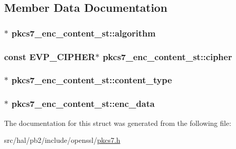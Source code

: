 \subsection{Member Data Documentation}
\subsubsection[{\texorpdfstring{algorithm}{algorithm}}]{$\ast$ pkcs7\+\_\+enc\+\_\+content\+\_\+st\+::algorithm}\hypertarget{structpkcs7__enc__content__st_af6c78a84b4ca86334dfc04a072ce1117}{}\label{structpkcs7__enc__content__st_af6c78a84b4ca86334dfc04a072ce1117}
\subsubsection[{\texorpdfstring{cipher}{cipher}}]{\setlength{\rightskip}{0pt plus 5cm}const {\bf E\+V\+P\+\_\+\+C\+I\+P\+H\+ER}$\ast$ pkcs7\+\_\+enc\+\_\+content\+\_\+st\+::cipher}\hypertarget{structpkcs7__enc__content__st_abb4444669fdf67803367ebddf34b8aff}{}\label{structpkcs7__enc__content__st_abb4444669fdf67803367ebddf34b8aff}
\subsubsection[{\texorpdfstring{content\+\_\+type}{content_type}}]{$\ast$ pkcs7\+\_\+enc\+\_\+content\+\_\+st\+::content\+\_\+type}\hypertarget{structpkcs7__enc__content__st_aae31932dd3ab5e4b1e54e9915f9c547c}{}\label{structpkcs7__enc__content__st_aae31932dd3ab5e4b1e54e9915f9c547c}
\subsubsection[{\texorpdfstring{enc\+\_\+data}{enc_data}}]{$\ast$ pkcs7\+\_\+enc\+\_\+content\+\_\+st\+::enc\+\_\+data}\hypertarget{structpkcs7__enc__content__st_ab4d08c0f1b94885ea0d0380ef4745c7b}{}\label{structpkcs7__enc__content__st_ab4d08c0f1b94885ea0d0380ef4745c7b}


The documentation for this struct was generated from the following file\+:\begin{DoxyCompactItemize}
\item 
src/hal/pb2/include/openssl/\hyperlink{pkcs7_8h}{pkcs7.\+h}\end{DoxyCompactItemize}
